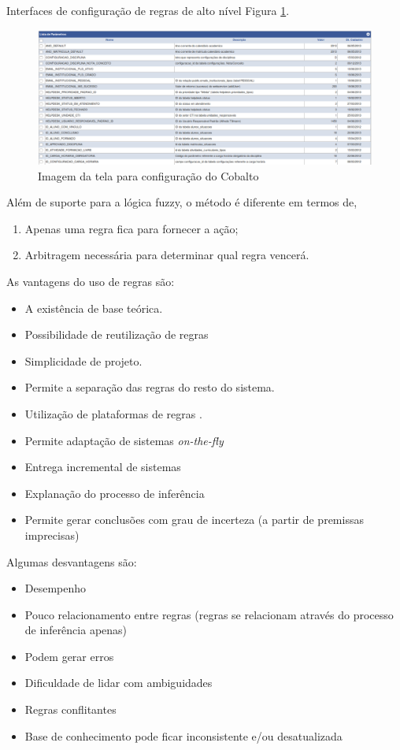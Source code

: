 \documentclass[12pt,a4paper,compsoc]{IEEEtran}
\begin{document}
  Interfaces de configuração de regras de alto nível  Figura \ref{config-cobalto}.

  \begin{figure}[!ht]
    \centerline{\includegraphics[width=.3\textwidth]{imagens/config-cobalto.png}}
    \caption{Imagem da tela para configuração do Cobalto}
    \label{config-cobalto}
  \end{figure}

  Além de suporte para a lógica fuzzy, o método é diferente em termos de,
  
  \begin{enumerate}
    \item Apenas uma regra fica para fornecer a ação;
    \item Arbitragem necessária para determinar qual regra vencerá.
  \end{enumerate}
  
  As vantagens do uso de regras são:

  \begin{itemize}
    \item A existência de base teórica.
    \item Possibilidade de reutilização de regras
    \item Simplicidade de projeto. 
    \item Permite a separação das regras do resto do sistema.
    \item Utilização de plataformas de regras .
    \item Permite adaptação de sistemas \textit{on-the-fly}
    \item Entrega incremental de sistemas
    \item Explanação do processo de inferência
    \item Permite gerar conclusões com grau de incerteza (a partir de premissas imprecisas)
  \end{itemize}
  
  Algumas desvantagens são:

  \begin{itemize}
    \item Desempenho
    \item Pouco relacionamento entre regras (regras se relacionam através do processo de inferência
    apenas)
    \item Podem gerar erros
    \item Dificuldade de lidar com ambiguidades
    \item Regras conflitantes
    \item Base de conhecimento  pode ficar inconsistente e/ou desatualizada  
  \end{itemize}
\end{document}
